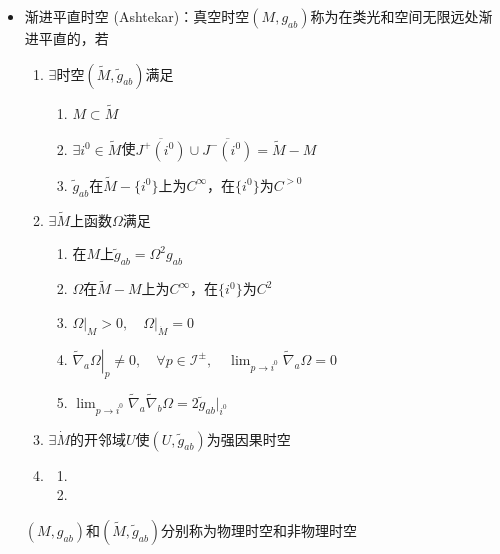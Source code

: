 \begin{itemize}
    \item 渐进平直时空 (Ashtekar)：真空时空$(M, g_{ab})$称为在类光和空间无限远处渐进平直的，若
    \begin{enumerate}
        \item $\exists$时空$(\tilde{M}, \tilde{g}_{ab})$满足
        \begin{enumerate}
            \item $M \subset \tilde{M}$
            \item $\exists i^0 \in \tilde{M}$使$\overline{J^+(i^0)} \cup \overline{J^-(i^0)} = \tilde{M} - M$
            \item $\tilde{g}_{ab}$在$\tilde{M}-\{i^0\}$上为$C^{\infty}$，在$\{i^0\}$为$C^{>0}$
        \end{enumerate}
        \item $\exists \tilde{M}$上函数$\Omega$满足
        \begin{enumerate}
            \item 在$M$上$\tilde{g}_{ab} = \Omega^2 g_{ab}$
            \item $\Omega$在$\tilde{M}-M$上为$C^{\infty}$，在$\{i^0\}$为$C^{2}$
            \item $\left.\Omega\right|_{M} > 0,\quad \left.\Omega\right|_{\dot{M}} = 0$
            \item $\left.\tilde{\nabla}_a \Omega \right|_p \neq 0,\quad \forall p \in \mathscr{I}^{\pm},\quad \displaystyle \lim_{p \to i^0} \tilde{\nabla}_a \Omega = 0$
            \item $\displaystyle \lim_{p \to i^0} \tilde{\nabla}_a \tilde{\nabla}_b \Omega = 2 \tilde{g}_{ab}|_{i^0}$
        \end{enumerate}
        \item $\exists \dot{M}$的开邻域$U$使$(U, \tilde{g}_{ab})$为强因果时空
        \item 
        \begin{enumerate}
            \item 
            \item 
        \end{enumerate}
    \end{enumerate}
    $(M, g_{ab})$和$(\tilde{M}, \tilde{g}_{ab})$分别称为物理时空和非物理时空
\end{itemize}